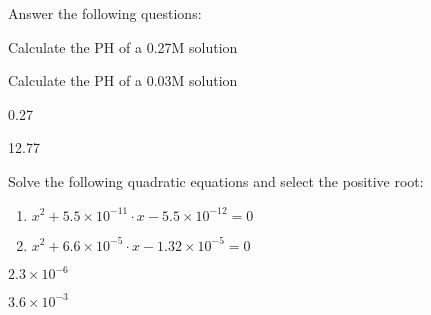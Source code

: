 \documentclass[main.tex]{subfiles}
\begin{document}
\begin{multicols*}{2}
\begin{solution}
\begin{inparaenum}[(a)]
 \end{inparaenum}
\hspace{0.1cm}\end{solution}%


\begin{question}[ID=\the\value{numA}]
Answer the following questions:
\begin{inparaenum}[(a)]
\item Calculate the PH of a 0.27M  solution %
\item Calculate the PH of a 0.03M  solution %
 \end{inparaenum}
\end{question}
\begin{solution}
\begin{inparaenum}[(a)]
\item  0.27
\item  12.77
 \end{inparaenum}
\hspace{0.1cm}\end{solution}%

\begin{question}[ID=\the\value{numA}]
Solve the following quadratic equations and select the positive root:
\begin{enumerate}[label=(\alph*)]
\item  $x^2 +5.5 \times 10^{-11}\cdot x -5.5 \times 10^{-12}=0$  %
\item  $x^2 +6.6 \times 10^{-5}\cdot x -1.32 \times 10^{-5}=0$  %
 \end{enumerate}
\end{question}
\begin{solution}
\begin{inparaenum}[(a)]
\item    $2.3\times 10^{-6}$
\item    $3.6\times 10^{-3}$
 \end{inparaenum}
\hspace{0.1cm}\end{solution}%



\end{multicols*}
\end{document}
